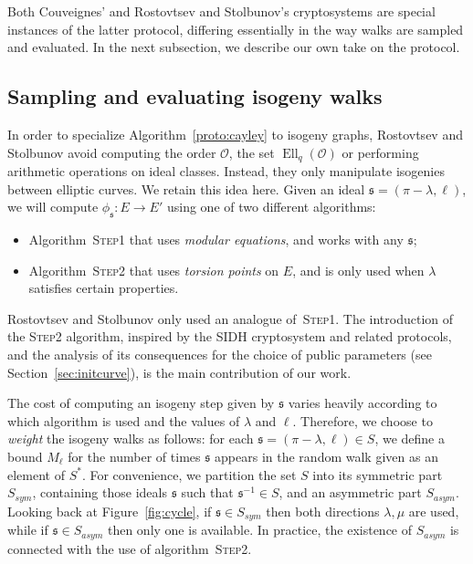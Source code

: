 \documentclass{article}
\renewcommand{\O}{\mathcal{O}}
\newcommand{\algstyle}[1]{\textsc{#1}}
\renewcommand{\frak}{\mathfrak}
\theoremstyle{definition}
\DeclareMathOperator{\Ell}{Ell}
\begin{document}
Both Couveignes' and Rostovtsev and Stolbunov's cryptosystems are
special instances of the latter protocol, differing essentially in the
way walks are sampled and evaluated. In the next subsection, we
describe our own take on the protocol.

\subsection{Sampling and evaluating isogeny walks}

In order to specialize Algorithm~\ref{proto:cayley} to isogeny graphs,
Rostovtsev and Stolbunov avoid computing the order $\O$, the set $\Ell_q(\O)$
or performing arithmetic operations on ideal classes. Instead, they only
manipulate isogenies between elliptic curves. We retain this idea here.
Given an ideal $\frak s = (\pi-\lambda, \ell)$, we will compute $\phi_{\frak s}:E\to E'$
using one of two different algorithms:
\begin{itemize}
\item Algorithm~\algstyle{Step1} that uses
	\emph{modular equations}, and works with any $\frak s$;
\item Algorithm~\algstyle{Step2} that
	uses \emph{torsion points} on $E$, and is only used when
	$\lambda$ satisfies certain properties.
\end{itemize}

Rostovtsev and Stolbunov only used an analogue of~\algstyle{Step1}. 
The introduction of the \algstyle{Step2} algorithm, 
inspired by the SIDH cryptosystem and related protocols, 
and the analysis of its consequences for the choice of public
parameters (see Section~\ref{sec:initcurve}),
is the main contribution of our work.

The cost of computing an isogeny step given by $\frak s$
varies heavily according to which algorithm is used and the values of $\lambda$
and $\ell$. Therefore, we choose to \emph{weight} the isogeny walks as
follows: for each $\frak s = (\pi-\lambda,\ell)\in S$,
we define a bound $M_\ell$ for the number of times $\frak s$
appears in the random walk given as an element of $S^*$.
For convenience, we partition the set $S$
into its symmetric part $S_{sym}$, containing those ideals $\frak s$ such that
$\frak s^{-1}\in S$, and an asymmetric part $S_{asym}$. Looking back at
Figure~\ref{fig:cycle}, if $\frak s\in S_{sym}$ then both directions
$\lambda,\mu$ are used, while if $\frak s\in S_{asym}$ then only one is
available. In practice, the existence of $S_{asym}$ is connected with the use of
algorithm~\algstyle{Step2}.
\end{document}
